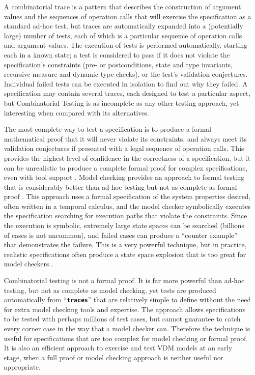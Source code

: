 \documentclass{overturerepchap}
\begin{document}
A combinatorial trace is a pattern that describes the construction of argument
values and the sequences of operation calls that will exercise the
specification as a standard ad-hoc test, but traces are automatically expanded
into a (potentially large) number of tests, each of which is a particular
sequence of operation calls and argument values. The execution of tests is
performed automatically, starting each in a known state; a test is considered
to pass if it does not violate the specification's constraints (pre- or
postconditions, state and type invariants, recursive measure and dynamic type
checks), or the test's validation conjectures. Individual failed tests can be
executed in isolation to find out why they failed.  A specification may contain
several traces, each designed to test a particular aspect, but Combinatorial
Testing is as incomplete as any other testing approach, yet interesting when
compared with its alternatives. 


The most complete way to test a specification is to produce a formal
mathematical proof that it will never violate its constraints, and always meet
its validation conjectures if presented with a legal sequence of operation
calls. This provides the highest level of confidence in the correctness of a
specification, but it can be unrealistic to produce a complete formal proof for
complex specifications, even with tool support \cite{Paulson97,Bicarregui&94}.
Model checking provides an approach to formal testing that is considerably
better than ad-hoc testing but not as complete as formal proof \cite{Clarke&99}.
This approach uses a formal specification of the system properties desired,
often written in a temporal calculus, and the model checker symbolically
executes the specification searching for execution paths that violate the
constraints. Since the execution is symbolic, extremely large state spaces can
be searched (billions of cases is not uncommon), and failed cases can produce a
``counter example'' that demonstrates the failure. This is a very powerful
technique, but in practice, realistic specifications often produce a state
space explosion that is too great for model checkers \cite{Clarke2012}.

Combinatorial testing is not a formal proof. It is far more powerful than
ad-hoc testing, but not as complete as model checking, yet tests are produced
automatically from ``\texttt{\textbf{traces}}'' that are relatively simple to
define without the need for extra model checking tools and expertise. The
approach allows specifications to be tested with perhaps millions of test
cases, but cannot guarantee to catch every corner case in the way that a model
checker can. Therefore the technique is useful for specifications that are too
complex for model checking or formal proof. It is also an efficient approach to
exercise and test VDM models at an early stage, when a full proof or model
checking approach is neither useful nor appropriate.
\end{document}
